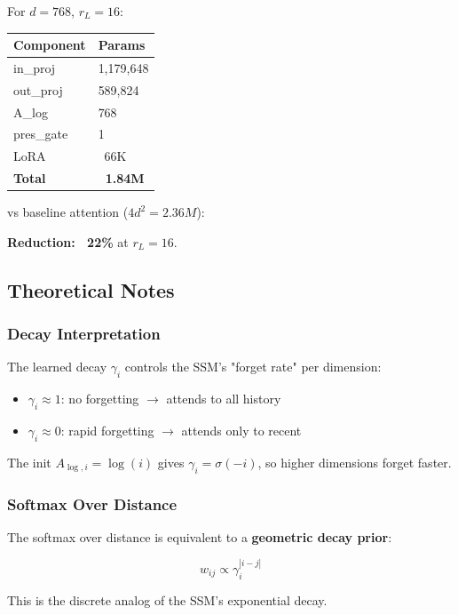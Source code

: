 For $d = 768$, $r_L = 16$:

\begin{table}[H]
\centering
\small
\begin{tabular}{ll}
\toprule
\textbf{Component} & \textbf{Params} \\
\midrule
in\_proj & 1,179,648 \\
out\_proj & 589,824 \\
A\_log & 768 \\
pres\_gate & 1 \\
LoRA & ~66K \\
\textbf{Total} & \textbf{~1.84M} \\
\bottomrule
\end{tabular}
\end{table}

vs baseline attention ($4 d^2 = 2.36M$):

\textbf{Reduction: ~22\%} at $r_L = 16$.

\subsection{Theoretical Notes}

\subsubsection{Decay Interpretation}

The learned decay $\gamma_i$ controls the SSM's "forget rate" per dimension:

\begin{itemize}
\item $\gamma_i \approx 1$: no forgetting $\to$ attends to all history
\item $\gamma_i \approx 0$: rapid forgetting $\to$ attends only to recent

\end{itemize}
The init $A_{\log, i} = \log(i)$ gives $\gamma_i = \sigma(-i)$, so higher 
dimensions forget faster.

\subsubsection{Softmax Over Distance}

The softmax over distance is equivalent to a \textbf{geometric decay prior}:

\[
w_{ij} \propto \gamma_i^{|i - j|}
\tag{4.16}
\]

This is the discrete analog of the SSM's exponential decay.

